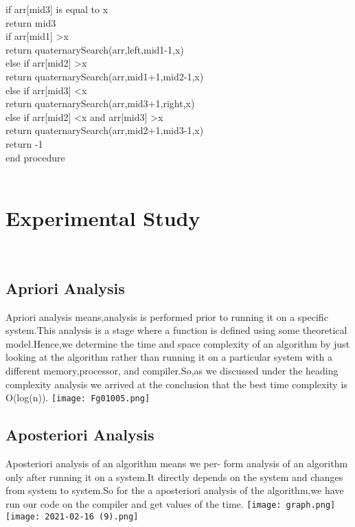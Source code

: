 \documentclass[conference]{IEEEtran}
\begin{document}
 if arr[mid3] is equal to x\\
 \indent
  \hspace{1cm}return mid3\\
  
  if arr[mid1] \textgreater x\\
  \indent
  \hspace{1cm}return quaternarySearch(arr,left,mid1-1,x)\\
  
  else if arr[mid2] \textgreater x\\
  \indent
   \hspace{1cm}return quaternarySearch(arr,mid1+1,mid2-1,x)\\
  
  else if arr[mid3] \textless x\\
  \indent
   \hspace{1cm}return quaternarySearch(arr,mid3+1,right,x)\\
   
  else if arr[mid2] \textless x and arr[mid3] \textgreater x\\
  \indent
   \hspace{1cm}return quaternarySearch(arr,mid2+1,mid3-1,x)\\
 
   
\noindent return -1\\
end procedure\\\\

\section{Experimental Study}\\
\subsection{Apriori Analysis}  
Apriori analysis means,analysis is performed prior
to running it on a specific system.This analysis is
a stage where a function is defined using some theoretical model.Hence,we determine the time and
space complexity of an algorithm by just looking
at the algorithm rather than running it on a particular system with a different memory,processor,
and compiler.So,as we discussed under the heading
complexity analysis we arrived at the conclusion
that the best time complexity is O(log(n)).
\texttt{[image: Fg01005.png]}
\subsection{Aposteriori Analysis}
Aposteriori analysis of an algorithm means we per-
form analysis of an algorithm only after running it on a system.It directly depends on the system
and changes from system to system.So for the a
aposteriori analysis of the algorithm,we have run
our code on the compiler and get values of the
time.
\texttt{[image: graph.png]}
\texttt{[image: 2021-02-16 (9).png]}
\end{document}
